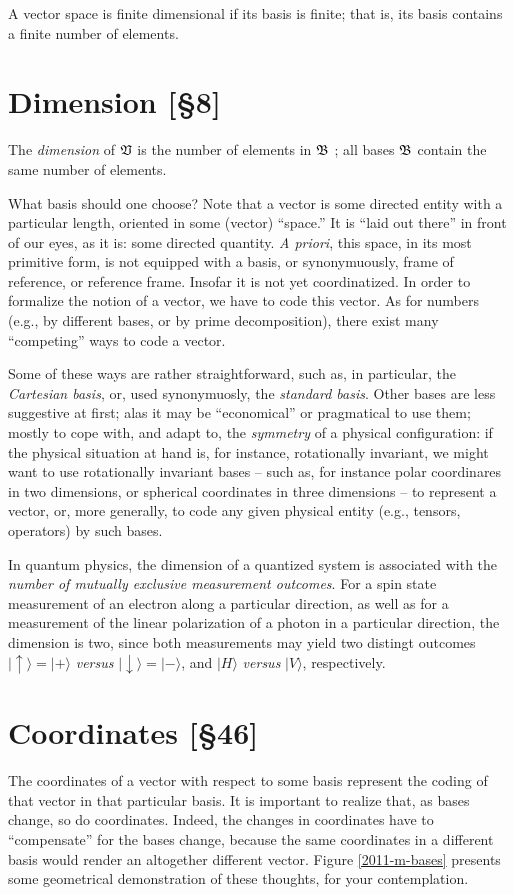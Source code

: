 A vector space is finite dimensional if its basis is finite; that is,   its basis
contains a finite number of elements.


\section{Dimension
[\S8]}
The {\em dimension}
of $\frak V$ is the number of elements in $\frak B$ ;
all bases $\frak B$ contain the same number of elements.


What basis should one choose?
Note that a vector is some directed entity with a particular length,
oriented in some (vector) ``space.''
It is ``laid out there'' in front of our eyes, as it is: some directed quantity.
{\it A priori}, this space, in its most primitive form,
is not equipped with a basis, or synonymuously, frame of reference, or reference frame.
Insofar it is not yet coordinatized.
In order to formalize the notion of a vector, we have to code this vector.
As for numbers (e.g., by different bases, or by prime decomposition),
there exist many ``competing'' ways to code a vector.

Some of these ways are rather straightforward, such as, in particular, the {\em Cartesian basis},
or, used synonymuosly, the  {\em standard basis}.
Other bases are less suggestive at first; alas it may be ``economical'' or pragmatical to use them;
mostly to cope with, and adapt to, the {\em symmetry} of a physical configuration:
if the physical situation at hand is, for instance, rotationally invariant,
we might want to use rotationally invariant bases --
such as, for instance polar coordinares in two dimensions, or spherical coordinates in three dimensions --
to represent a vector, or, more generally, to code any given physical entity
(e.g., tensors, operators) by such bases.

{\color{Purple}
In quantum physics, the dimension of a quantized system is associated with
the {\em number of mutually exclusive measurement outcomes}.
For a spin state measurement of an electron
along a particular direction,
as well as for a measurement of the linear polarization
of a photon in a particular direction,
the dimension is two, since both measurements
may yield two distingt outcomes
$
\mid \uparrow \rangle    =\mid + \rangle$ {\it versus} $
\mid \downarrow \rangle   =\mid - \rangle
$,
and
$
\mid H \rangle $ {\it versus} $
\mid V \rangle
$, respectively.
}

\section{Coordinates [\S46]}
The coordinates of a vector with respect to some basis
represent the coding of that vector in that particular basis.
It is important to realize that, as bases change, so do coordinates.
Indeed, the changes in coordinates have to ``compensate'' for the bases change,
because the same coordinates in a different basis would render an altogether different
vector.
Figure \ref{2011-m-bases} presents some geometrical demonstration of
these thoughts, for your contemplation.

